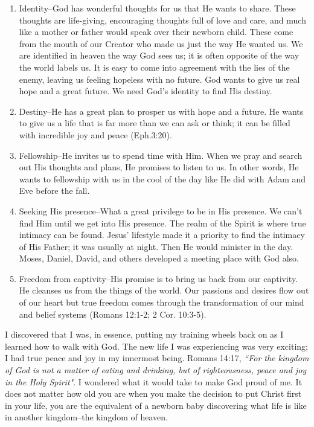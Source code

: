 \documentclass[oneside,12pt]{book}
\begin{document}
\begin{enumerate}
	\item Identity--God has wonderful thoughts for us that He wants to share. These thoughts are life-giving, encouraging thoughts full of love and care, and much like a mother or father would speak over their newborn child. These come from the mouth of our Creator who made us just the way He wanted us. We are identified in heaven the way God sees us; it is often opposite of the way the world labels us. It is easy to come into agreement with the lies of the enemy, leaving us feeling hopeless with no future. God wants to give us real hope and a great future. We need God's identity to find His destiny.
	\item Destiny--He has a great plan to prosper us with hope and a future. He wants to give us     a life that is far more than we can ask or think; it can be filled with incredible joy and peace (Eph.3:20).	
	\item Fellowship--He invites us to spend time with Him. When we pray and search out His thoughts and plans, He promises to listen to us. In other words, He wants to fellowship with us in the cool of the day like He did with Adam and Eve before the fall.	
	\item Seeking His presence--What a great privilege to be in His presence. We can't find Him until we get into His presence. The realm of the Spirit is where true intimacy can be found. Jesus' lifestyle made it a priority to find the intimacy of His Father; it was usually at night. Then He would minister in the day. Moses, Daniel, David, and others developed a meeting place with God also.	
	\item Freedom from captivity--His promise is to bring us back from our captivity. He cleanses us from the things of the world. Our passions and desires flow out of our heart but true freedom comes through the transformation of our mind and belief systems (Romans 12:1-2; 2 Cor. 10:3-5).
\end{enumerate}

I discovered that I was, in essence, putting my training wheels back on as I learned how to walk with God. The new life I was experiencing was very exciting; I had true peace and joy in my innermost being. Romans 14:17, \textit{``For the kingdom of God is not a matter of eating and drinking, but of righteousness, peace and joy in the Holy Spirit"}. I wondered what it would take to make God proud of me. It does not matter how old you are when you make the decision to put Christ first in your life, you are the equivalent of a newborn baby discovering what life is like in another kingdom--the kingdom of heaven.
\end{document}
